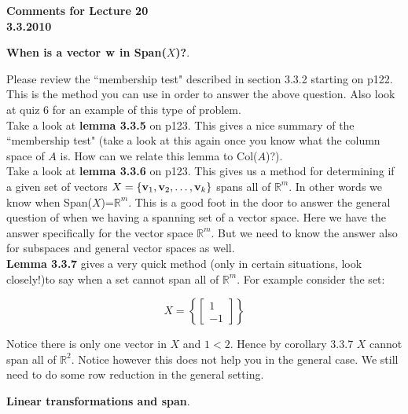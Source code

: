 \documentclass[12pt]{article}
\begin{document}
\begin{center}
{\large \bf Comments for Lecture 20}\\
\bf{3.3.2010}
\end{center}


\begin{center}{\LARGE \bf When is a vector ${\bf w}$ in Span($X$)?}.\end{center}

Please review the ``membership test" described in section 3.3.2 starting on p122.  This is the method you can use in order to answer the above question.  Also look at quiz 6 for an example of this type of problem. \\

Take a look at {\bf lemma 3.3.5} on p123.  This gives a nice summary of the ``membership test" (take a look at this again once you know what the column space of $A$ is.  How can we relate this lemma to Col($A$)?).\\

Take a look at {\bf lemma 3.3.6} on p123. This gives us a method for determining if a given set of vectors $X=\{{\bf v}_1, {\bf v}_2, \ldots , {\bf v}_k\}$ spans all of $\mathbb{R}^m$.  In other words we know when Span($X$)=$\mathbb{R}^m$.  This is a good foot in the door to answer the general question of when we having a spanning set of a vector space.  Here we have the answer specifically for the vector space $\mathbb{R}^m$.  But we need to know the answer also for subspaces and general vector spaces as well.\\

{\bf Lemma 3.3.7} gives a very quick method (only in certain situations, look closely!)to say when a set cannot span all of $\mathbb{R}^m$.  For example consider the set:

\[X = \left \{ \left[ \begin{array}{c} 1  \\ -1  \end{array} \right] \right\} \]

Notice there is only one vector in $X$ and $1< 2$. Hence by corollary 3.3.7 $X$ cannot span all of $\mathbb{R}^2$.  Notice however this does not help you in the general case.  We still need to do some row reduction in the general setting.


\begin{center}{\LARGE \bf Linear transformations and span}.\end{center}
\end{document}

